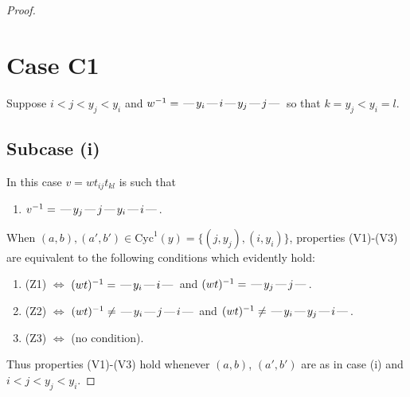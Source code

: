 \documentclass[10pt]{article}
\theoremstyle{definition}
\theoremstyle{definition}
\def\dash{\text{\hspace{0.5mm}---\hspace{0.5mm}}}
\def\Cyc{\mathrm{Cyc}}
\begin{document}
\begin{proof}
\section{Case C1}
Suppose $i < j < y_j < y_i$ and $w^{-1} = \dash y_i\dash i\dash y_j\dash j\dash $ so that $k=y_j < y_i=l$.
\subsection{Subcase (i)}
In this case $v = wt_{ij}t_{kl}$ is such that
\begin{enumerate}\item[]$v^{-1} = \dash y_j\dash j\dash y_i\dash i\dash $.\end{enumerate}
When $(a,b),(a',b')\in\Cyc^1(y)= \{(j,y_j),(i,y_i)\}$,
properties (V1)-(V3) are equivalent to the following conditions which evidently hold:
\begin{enumerate}
\item[](Z1) $\Leftrightarrow$ $(wt)^{-1} = \dash y_i \dash i \dash$  and $(wt)^{-1} = \dash y_j \dash j \dash$.
\item[](Z2) $\Leftrightarrow$ $(wt)^{-1} \neq \dash y_i \dash j \dash i \dash$ and $(wt)^{-1}\neq \dash y_i \dash y_j \dash i \dash$.
\item[](Z3) $\Leftrightarrow$ (no condition).
\end{enumerate}
Thus properties (V1)-(V3) hold whenever
$(a,b)$, $(a',b')$ are as in case (i) and $i < j < y_j < y_i$.

\end{proof}
\end{document}
